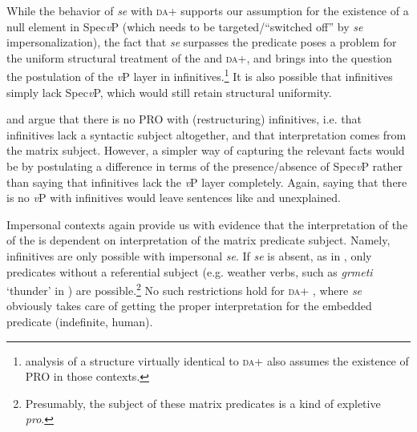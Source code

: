 \documentclass[output=paper,modfonts,newtxmath,hidelinks,]{langscibook}
\begin{document}
\ea \label{7:ex14}
	\z
\z

\noindent While the behavior of \textit{se} with \textsc{da}+ supports our assumption for the existence of a null element in Spec\textit{v}P (which needs to be targeted/``switched off'' by \textit{se} impersonalization), the fact that \textit{se} surpasses the  predicate poses a problem for the uniform structural treatment of the  and \textsc{da}+, and brings into the question the postulation of the \textit{v}P layer in infinitives.\footnote{\label{7:fn5} analysis of a structure virtually identical to \textsc{da}+ also assumes the existence of PRO in those contexts.} It is also possible that infinitives simply lack Spec\textit{v}P, which would still retain structural uniformity.\largerpage[2]

\citet{Wurmbrand2003} and \citet{TodorovicWurmbrand2015} argue that there is no PRO with (restructuring) infinitives, i.e. that infinitives lack a syntactic subject altogether, and that interpretation comes from the matrix subject. However, a simpler way of capturing the relevant facts would be by postulating a difference in terms of the presence/absence of Spec\textit{v}P rather than saying that infinitives lack the \textit{v}P layer completely. Again, saying that there is no \textit{v}P with infinitives would leave sentences like  and  unexplained.

Impersonal contexts again provide us with evidence that the interpretation of the  of the  is dependent on interpretation of the matrix predicate subject. Namely, infinitives are only possible with impersonal \textit{se}. If \textit{se} is absent, as in , only predicates without a referential subject (e.g. weather verbs, such as \textit{grmeti} ‘thunder’ in ) are possible.\footnote{\label{7:fn6}Presumably, the subject of these matrix predicates is a kind of expletive \textit{pro}.} No such restrictions hold for \textsc{da}+ , where \textit{se} obviously takes care of getting the proper interpretation for the embedded predicate (indefinite, human).
\end{document}

